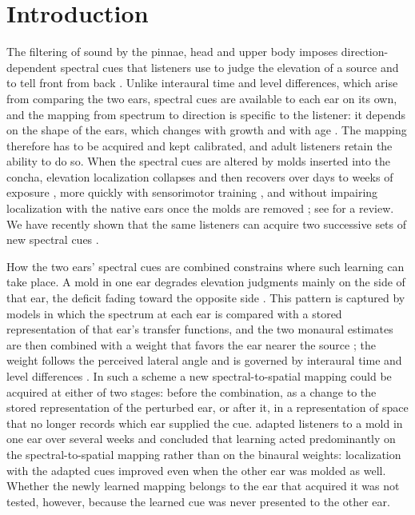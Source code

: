 \section{\label{sec:1} Introduction}

The filtering of sound by the pinnae, head and upper body imposes
direction-dependent spectral cues that listeners use to judge the elevation of
a source and to tell front from back
\citep{blauert_sound_1969, middlebrooks_narrow-band_1992, baumgartner_modeling_2014}.
Unlike interaural time and level differences, which arise from comparing the
two ears, spectral cues are available to each ear on its own, and the mapping
from spectrum to direction is specific to the listener: it depends on the shape
of the ears, which changes with growth and with age
\citep{keen_growth_1988, otte_age-related_2013}. The mapping therefore has to
be acquired and kept calibrated, and adult listeners retain the ability to do
so. When the spectral cues are altered by molds inserted into the concha,
elevation localization collapses and then recovers over days to weeks of
exposure \citep{hofman_relearning_1998, van_wanrooij_relearning_2005, trapeau_fast_2016},
more quickly with sensorimotor training
\citep{parseihian_rapid_2012, carlile_relearning_2014}, and without impairing
localization with the native ears once the molds are removed
\citep{hofman_relearning_1998, trapeau_fast_2016}; see
\citet{carlile_plastic_2014} for a review. We have recently shown that the
same listeners can acquire two successive sets of new spectral cues
\citep{friedrich_adaptation_2025}.

How the two ears' spectral cues are combined constrains where such learning can
take place. A mold in one ear degrades elevation judgments mainly on the side of
that ear, the deficit fading toward the opposite side
\citep{hofman_binaural_2003, van_wanrooij_relearning_2005}. This pattern is
captured by models in which the spectrum at each ear is compared with a stored
representation of that ear's transfer functions, and the two monaural estimates
are then combined with a weight that favors the ear nearer the source
\citep{hofman_binaural_2003, baumgartner_modeling_2014}; the weight follows the
perceived lateral angle and is governed by interaural time and level
differences \citep{macpherson_binaural_2007}. In such a scheme a new
spectral-to-spatial mapping could be acquired at either of two stages: before
the combination, as a change to the stored representation of the perturbed
ear, or after it, in a representation of space that no longer records which ear
supplied the cue. \citet{van_wanrooij_relearning_2005} adapted listeners to a
mold in one ear over several weeks and concluded that learning acted
predominantly on the spectral-to-spatial mapping rather than on the binaural
weights: localization with the adapted cues improved even when the other ear
was molded as well. Whether the newly learned mapping belongs to the ear that
acquired it was not tested, however, because the learned cue was never
presented to the other ear.

